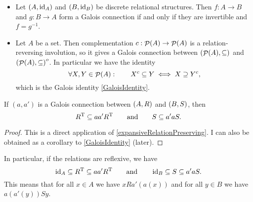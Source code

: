 \begin{example}
\begin{itemize}
\item Let $\left( A, \operatorname{id}_A \right)$ and $\left( B, \operatorname{id}_B \right)$ be discrete relational structures. Then $f: A\to B$ and $g: B \to A$ form a Galois connection if and only if they are invertible and $f = g^{-1}$.
\item Let $A$ be a set. Then complementation $c: \mathop{\mathcal{P}}(A) \to \mathop{\mathcal{P}}(A)$ is a relation-reversing involution, so it gives a Galois connection between $\left( \mathop{\mathcal{P}}(A), \subseteq \right)$ and $\left( \mathop{\mathcal{P}}(A), \subseteq \right)^o$. In particular we have the identity
\[ \forall X, Y\in\mathop{\mathcal{P}}(A): \qquad X^c \subseteq Y \iff X \supseteq Y^c, \]
which is the Galois identity \ref{GaloisIdentity}.
\end{itemize}
\end{example}

\begin{lemma}
If $(a,a')$ is a Galois connection between $\left( A,R \right)$ and $\left( B,S \right)$, then
\[ R^{\mathrm{T}} \subseteq aa'R^{\mathrm{T}} \qquad\text{and}\qquad S \subseteq a'aS. \]
\end{lemma}
\begin{proof}
This is a direct application of \ref{expansiveRelationPreserving}. I can also be obtained as a corollary to \ref{GaloisIdentity} (later).
\end{proof}

In particular, if the relations are reflexive, we have
\[ \operatorname{id}_A \subseteq R^{\mathrm{T}} \subseteq aa'R^{\mathrm{T}} \qquad\text{and}\qquad \operatorname{id}_B \subseteq S \subseteq a'aS. \]
This means that for all $x\in A$ we have $ xRa'(a(x))$ and for all $y\in B$ we have $a(a'(y))Sy$.

